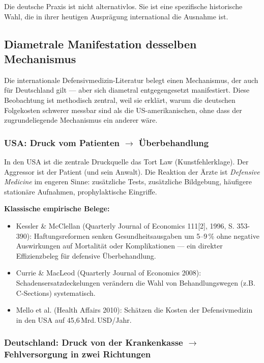 \documentclass{umbruch-position}
\begin{document}
Die deutsche Praxis ist nicht alternativlos. Sie ist eine spezifische historische Wahl, die in ihrer heutigen Ausprägung international die Ausnahme ist.

\subsection{Diametrale Manifestation desselben Mechanismus}

Die internationale Defensivmedizin-Literatur belegt einen Mechanismus, der auch für Deutschland gilt --- aber sich diametral entgegengesetzt manifestiert. Diese Beobachtung ist methodisch zentral, weil sie erklärt, warum die deutschen Folgekosten schwerer messbar sind als die US-amerikanischen, ohne dass der zugrundeliegende Mechanismus ein anderer wäre.

\subsubsection{USA: Druck vom Patienten $\to$ Überbehandlung}

In den USA ist die zentrale Druckquelle das Tort Law (Kunstfehlerklage). Der Aggressor ist der Patient (und sein Anwalt). Die Reaktion der Ärzte ist \textit{Defensive Medicine} im engeren Sinne: zusätzliche Tests, zusätzliche Bildgebung, häufigere stationäre Aufnahmen, prophylaktische Eingriffe.

\textbf{Klassische empirische Belege:}
\begin{itemize}[nosep]
  \item Kessler \& McClellan (Quarterly Journal of Economics 111[2], 1996, S. 353-390): Haftungsreformen senken Gesundheitsausgaben um 5--9\,\% ohne negative Auswirkungen auf Mortalität oder Komplikationen --- ein direkter Effizienzbeleg für defensive Überbehandlung.
  \item Currie \& MacLeod (Quarterly Journal of Economics 2008): Schadensersatzdeckelungen verändern die Wahl von Behandlungswegen (z.B. C-Sections) systematisch.
  \item Mello et al. (Health Affairs 2010): Schätzen die Kosten der Defensivmedizin in den USA auf 45,6\,Mrd.\,USD/Jahr.
\end{itemize}

\subsubsection{Deutschland: Druck von der Krankenkasse $\to$ Fehlversorgung in zwei Richtungen}
\end{document}
